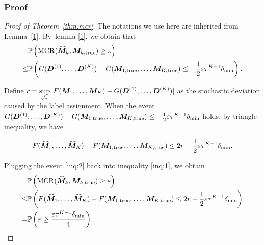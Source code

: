 \documentclass{article}
\DeclareMathOperator*{\mcr}{MCR}
\begin{document}
\begin{appendices}
\subsubsection{Proof}
\begin{proof}[Proof of Theorem~\ref{thm:mcr}]
The notations we use here are inherited from Lemma~\ref{1}. By~lemma \ref{1}, we obtain that
\begin{align}\label{inq:1}
   &\mathbb{P}\left(\mcr(\widehat{\mM}_k, \mM_{k,\text{true}})\geq \varepsilon\right)\notag \\
\leq & \mathbb{P}\left(G(\mD^{(1)},\ldots,\mD^{(K)})-G(\mM_{1,\text{true}},\ldots,\mM_{K,\text{true}})\leq -\frac{1}{2}\varepsilon\tau^{K-1}\delta_{\min}\right).
\end{align}


Define $r=\displaystyle\sup_{\mathcal{J}_\tau} |F(\bm M_1,\ldots,\bm M_K)-G(\bm{D}^{(1)},\ldots,\bm{D}^{(K)})|$ as the stochastic deviation caused by the label assignment. When the event $G(\bm{D}^{(1)},\ldots,\bm{D}^{(K)})-G(\bm M_{1,\text{true}},\ldots,\bm M_{K,\text{true}})\leq -\frac{1}{2}\varepsilon\tau^{K-1}\delta_{\min}$ holds, by triangle inequality, we have

\begin{equation} \label{inq:2}
F(\widehat{\bm M}_1,\ldots,\widehat{\bm M}_K)-F(\bm M_{1,\text{true}},\ldots,\bm M_{K,\text{true}})\leq  2r-\frac{1}{2}\varepsilon\tau^{K-1}\delta_{\min}.
\end{equation}

Plugging the event \eqref{inq:2} back into inequality \eqref{inq:1}, we obtain
\begin{equation}\label{inq:3}
\begin{split}
    &\mathbb{P}\left(\mcr(\widehat{\mM}_k, \mM_{k,\text{true}})\geq \varepsilon\right)\\
    \leq & \mathbb{P}\left(F(\widehat{\mM}_1,\ldots,\widehat{\mM}_K)-F(\mM_{1,\text{true}},\ldots,\mM_{K,\text{true}})\leq 2r-\frac{1}{2}\varepsilon\tau^{K-1}\delta_{\min}\right)\\
    =& \mathbb{P}\left(r \geq\frac{\varepsilon\tau^{K-1}\delta_{\min}}{4}\right).
\end{split}
\end{equation}


\end{proof}
\end{appendices}
\end{document}
